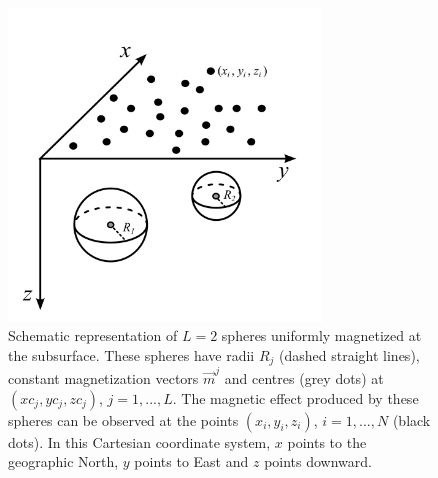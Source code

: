 \documentclass[journal abbreviation, npg]{copernicus}
\begin{document}







\begin{figure}[t]
\vspace*{2mm}
\begin{center}
\includegraphics[width=8.3cm]{Figures/Fig1.png}
\end{center}
\caption{Schematic representation of $L = 2$ spheres uniformly magnetized at the subsurface. These spheres have radii $R_{j}$ (dashed straight lines), constant magnetization vectors $\vec{m}^{j}$ and centres (grey dots) at $(xc_{j}, yc_{j}, zc_{j})$, $j = 1, ..., L$. The magnetic effect produced by these spheres can be observed at the points $(x_{i}, y_{i}, z_{i})$, $i = 1, ..., N$ (black dots). In this Cartesian coordinate system, $x$ points to the geographic North, $y$ points to East and $z$ points downward.}
\label{fig:geometric-aspects}
\end{figure}
\end{document}
